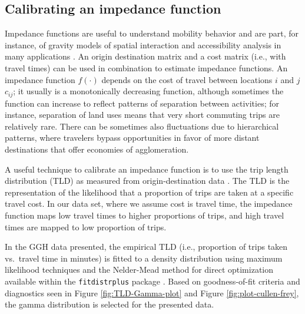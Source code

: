 \documentclass[Royal,times,sageh]{sagej}
\begin{document}
\hypertarget{calibrating-an-impedance-function}{%
\subsection{Calibrating an impedance
function}\label{calibrating-an-impedance-function}}

Impedance functions are useful to understand mobility behavior and are
part, for instance, of gravity models of spatial interaction
\citep{wilson1971, haynes_gravity_1985} and accessibility analysis in
many applications
\citep{hansen_how_1959, levinson_accessibility_1998, talen_assessing_1998, reggiani_accessibility_2011, paez_jobs_2013, kuai_examining_2017, barboza_balancing_2021}.
An origin destination matrix and a cost matrix (i.e., with travel times)
can be used in combination to estimate impedance functions. An impedance
function \(f(\cdot)\) depends on the cost of travel between locations
\(i\) and \(j\) \(c_{ij}\); it usually is a monotonically decreasing
function, although sometimes the function can increase to reflect
patterns of separation between activities; for instance, separation of
land uses means that very short commuting trips are relatively rare.
There can be sometimes also fluctuations due to hierarchical patterns,
where travelers bypass opportunities in favor of more distant
destinations that offer economies of agglomeration.

A useful technique to calibrate an impedance function is to use the trip
length distribution (TLD) as measured from origin-destination data
\citep{horbachov_theoretical_2018, batista_estimation_2019}. The TLD is
the representation of the likelihood that a proportion of trips are
taken at a specific travel cost. In our data set, where we assume cost
is travel time, the impedance function maps low travel times to higher
proportions of trips, and high travel times are mapped to low proportion
of trips.

In the GGH data presented, the empirical TLD (i.e., proportion of trips
taken vs.~travel time in minutes) is fitted to a density distribution
using maximum likelihood techniques and the Nelder-Mead method for
direct optimization available within the \texttt{fitdistrplus} package
\citep{fitdistrplus_2015}. Based on goodness-of-fit criteria and
diagnostics seen in Figure \ref{fig:TLD-Gamma-plot} and Figure
\ref{fig:plot-cullen-frey}, the gamma distribution is selected for the
presented data.
\end{document}
